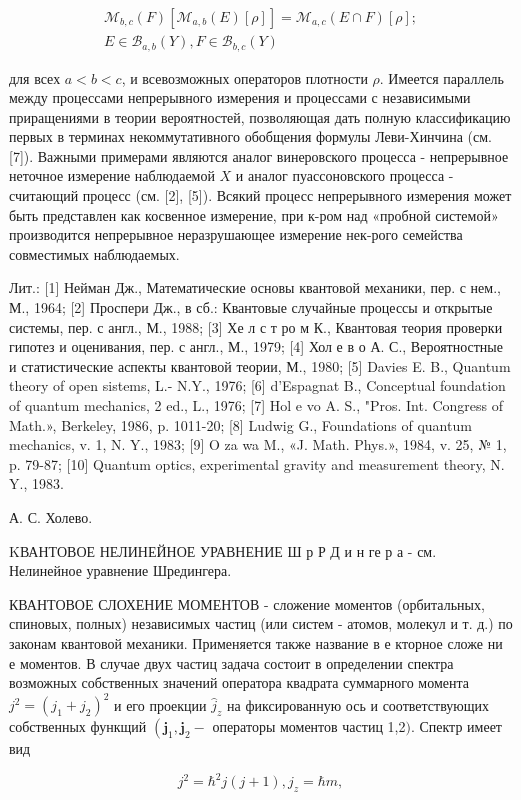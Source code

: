 \documentclass[10pt]{article}
\begin{document}
\[

\begin{gathered}

\mathscr{M}_{b, c}(F)\left[\mathscr{M}_{a, b}(E)[\rho]\right]=\mathscr{M}_{a, c}(E \cap F)[\rho] ; \\

E \in \mathscr{B}_{a, b}(Y), F \in \mathscr{B}_{b, c}(Y)

\end{gathered}

\]



для всех $a<b<c$, и всевозможных операторов плотности $\rho$. Имеется параллель между процессами непрерывного измерения и процессами с независимыми приращениями в теории вероятностей, позволяющая дать полную классификацию первых в терминах некоммутативного обобщения формулы Леви-Хинчина (см. [7]). Важными примерами являются аналог винеровского процесса - непрерывное неточное измерение наблюдаемой $X$ и аналог пуассоновского процесса - считающий процесс (см. [2], [5]). Всякий процесс непрерывного измерения может быть представлен как косвенное измерение, при к-ром над «пробной системой» производится непрерывное неразрушающее измерение нек-рого семейства совместимых наблюдаемых.



Лит.: [1] Нейман Дж., Математические основы квантовой механики, пер. с нем., М., 1964; [2] Проспери Дж., в сб.: Квантовые случайные процессы и открытые системы, пер. с англ., М., 1988; [3] Хе л с т ро м К., Квантовая теория проверки гипотез и оценивания, пер. с англ., М., 1979; [4] Хол е в о А. С., Вероятностные и статистические аспекты квантовой теории, М., 1980; [5] Davies E. B., Quantum theory of open sistems, L.- N.Y., 1976; [6] d'Espagnat B., Conceptual foundation of quantum mechanics, 2 ed., L., 1976; [7] Hol e vo A. S., "Pros. Int. Congress of Math.», Berkeley, 1986, p. 1011-20; [8] Ludwig G., Foundations of quantum mechanics, v. 1, N. Y., 1983; [9] O za wa M., «J. Math. Phys.», 1984, v. 25, № 1, p. 79-87; [10] Quantum optics, experimental gravity and measurement theory, N. Y., 1983.



А. С. Холево.



KВАНТОВОЕ НЕЛИНЕЙНОЕ УРАВНЕНИЕ Ш р Р Д и н ге р а - см. Нелинейное уравнение Шредингера.



КВАНТОВОЕ СЛОХЕНИЕ МОМЕНТОВ - сложение моментов (орбитальных, спиновых, полных) независимых частиц (или систем - атомов, молекул и т. д.) по законам квантовой механики. Применяется также название в е кторное сложе ни е моментов. В случае двух частиц задача состоит в определении спектра возможных собственных значений оператора квадрата суммарного момента $j^{2}=\left(j_{1}+j_{2}\right)^{2}$ и его проекции $\hat{j}_{z}$ на фиксированную ось и соответствующих собственных функщий $\left(\boldsymbol{j}_{1}, \boldsymbol{j}_{2}-\right.$ операторы моментов частиц 1,2$)$. Спектр имеет вид



\[

j^{2}=\hbar^{2} j(j+1), j_{z}=\hbar m,

\]
\end{document}
